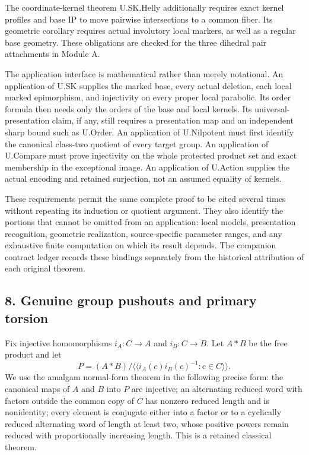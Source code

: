 \documentclass[
  11pt,
  a4paper,
]{article}
\begin{document}
The coordinate-kernel theorem U.SK.Helly additionally requires exact
kernel profiles and base IP to move pairwise intersections to a common
fiber. Its geometric corollary requires actual involutory local markers,
as well as a regular base geometry. These obligations are checked for
the three dihedral pair attachments in Module A.

The application interface is mathematical rather than merely notational.
An application of U.SK supplies the marked base, every actual deletion,
each local marked epimorphism, and injectivity on every proper local
parabolic. Its order formula then needs only the orders of the base and
local kernels. Its universal-presentation claim, if any, still requires
a presentation map and an independent sharp bound such as U.Order. An
application of U.Nilpotent must first identify the canonical class-two
quotient of every target group. An application of U.Compare must prove
injectivity on the whole protected product set and exact membership in
the exceptional image. An application of U.Action supplies the actual
encoding and retained surjection, not an assumed equality of kernels.

These requirements permit the same complete proof to be cited several
times without repeating its induction or quotient argument. They also
identify the portions that cannot be omitted from an application: local
models, presentation recognition, geometric realization, source-specific
parameter ranges, and any exhaustive finite computation on which its
result depends. The companion contract ledger records these bindings
separately from the historical attribution of each original theorem.

\subsection{8. Genuine group pushouts and primary
torsion}\label{genuine-group-pushouts-and-primary-torsion}

Fix injective homomorphisms \(i_A:C\to A\) and \(i_B:C\to B\). Let
\(A*B\) be the free product and let \[
P=(A*B)/\langle\!\langle i_A(c)i_B(c)^{-1}:c\in C\rangle\!\rangle.
\tag{8.1}
\] We use the amalgam normal-form theorem in the following precise form:
the canonical maps of \(A\) and \(B\) into \(P\) are injective; an
alternating reduced word with factors outside the common copy of \(C\)
has nonzero reduced length and is nonidentity; every element is
conjugate either into a factor or to a cyclically reduced alternating
word of length at least two, whose positive powers remain reduced with
proportionally increasing length. This is a retained classical theorem.
\end{document}
